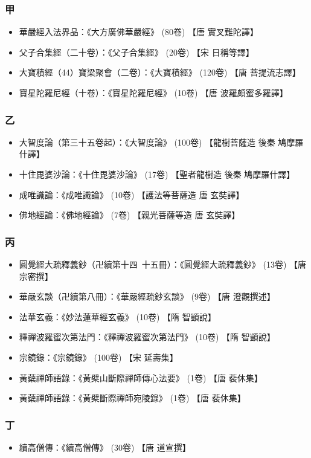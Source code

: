 \subsubsection{甲}
\begin{itemize}
  \item 華嚴經入法界品：《大方廣佛華嚴經》 (80卷) 【唐 實叉難陀譯】
  \item 父子合集經（二十卷）：《父子合集經》 (20卷) 【宋 日稱等譯】
  \item 大寶積經（44）寶梁聚會（二卷）：《大寶積經》 (120卷) 【唐 菩提流志譯】
  \item 寶星陀羅尼經（十卷）：《寶星陀羅尼經》 (10卷) 【唐 波羅頗蜜多羅譯】
\end{itemize}
\subsubsection{乙}
\begin{itemize}
  \item 大智度論（第三十五卷起）：《大智度論》 (100卷) 【龍樹菩薩造 後秦 鳩摩羅什譯】
  \item 十住毘婆沙論：《十住毘婆沙論》 (17卷) 【聖者龍樹造 後秦 鳩摩羅什譯】
  \item 成唯識論：《成唯識論》 (10卷) 【護法等菩薩造 唐 玄奘譯】
  \item 佛地經論：《佛地經論》 (7卷) 【親光菩薩等造 唐 玄奘譯】
\end{itemize}
\subsubsection{丙}
\begin{itemize}
  \item 圓覺經大疏釋義鈔（卍續第十四~十五冊）：《圓覺經大疏釋義鈔》 (13卷) 【唐 宗密撰】
  \item 華嚴玄談（卍續第八冊）：《華嚴經疏鈔玄談》 (9卷) 【唐 澄觀撰述】
  \item 法華玄義：《妙法蓮華經玄義》 (10卷) 【隋 智顗說】
  \item 釋禪波羅蜜次第法門：《釋禪波羅蜜次第法門》 (10卷) 【隋 智顗說】
  \item 宗鏡錄：《宗鏡錄》 (100卷) 【宋 延壽集】
  \item 黃蘗禪師語錄：《黃檗山斷際禪師傳心法要》 (1卷) 【唐 裴休集】
  \item 黃蘗禪師語錄：《黃檗斷際禪師宛陵錄》 (1卷) 【唐 裴休集】
\end{itemize}
\subsubsection{丁}
\begin{itemize}
  \item 續高僧傳：《續高僧傳》 (30卷) 【唐 道宣撰】
\end{itemize}

